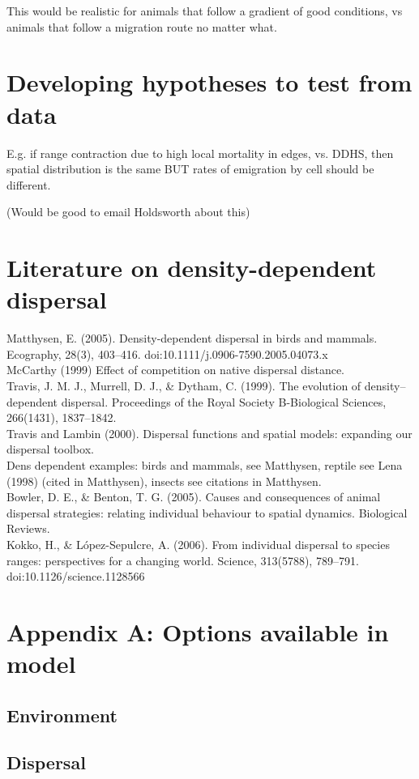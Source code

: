 \documentclass{article}
\begin{document}
This would be realistic for animals that follow a gradient of good
conditions, vs animals that follow a migration route no matter what.

\section{Developing hypotheses to test from data}
E.g. if range contraction due to high local mortality in edges,
vs. DDHS, then spatial distribution is the same BUT rates of
emigration by cell should be different.

(Would be good to email Holdsworth about this)

\section*{Literature on density-dependent dispersal}
Matthysen, E. (2005). Density-dependent dispersal in birds and
mammals. Ecography, 28(3),
403–416. doi:10.1111/j.0906-7590.2005.04073.x \\

McCarthy (1999) Effect of competition on native dispersal distance.\\

Travis, J. M. J., Murrell, D. J., \& Dytham, C. (1999). The evolution
of density–dependent dispersal. Proceedings of the Royal Society
B-Biological Sciences, 266(1431), 1837–1842. \\

Travis and Lambin (2000). Dispersal functions and spatial models:
expanding our dispersal toolbox. \\

Dens dependent examples: birds and mammals, see Matthysen, reptile see
Lena (1998) (cited in Matthysen), insects see citations in
Matthysen.\\

Bowler, D. E., \& Benton, T. G. (2005). Causes and consequences of
animal dispersal strategies: relating individual behaviour to spatial
dynamics. Biological Reviews. \\

Kokko, H., \& López-Sepulcre, A. (2006). From individual dispersal to
species ranges: perspectives for a changing world. Science, 313(5788),
789–791. doi:10.1126/science.1128566\\

\section{Appendix A: Options available in model}
\subsection{Environment}
\subsection{Dispersal}
\end{document}
